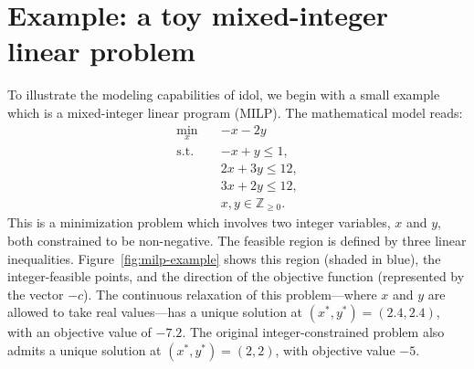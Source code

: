 \section{Example: a toy mixed-integer linear problem}
\label{sec:milp-example}

To illustrate the modeling capabilities of \textsf{idol}, we begin with a
small example which is a mixed-integer linear program (MILP). 
%
The mathematical model reads:
\begin{subequations}
    \label{eq:milp-example}
    \begin{align}
        \min_x \quad & -x - 2y \\
        \text{s.t.} & -x + y \le 1, \\
        & 2x + 3y \le 12, \\
        & 3x + 2y \le 12, \\
        & x,y\in\mathbb{Z}_{\ge 0}.
    \end{align}
\end{subequations}
This is a minimization problem which involves two integer variables, $x$ and
$y$, both constrained to be non-negative. The feasible region is defined by
three linear inequalities. Figure~\ref{fig:milp-example} shows this region
(shaded in blue), the integer-feasible points, and the direction of the
objective function (represented by the vector $-c$).
%
The continuous relaxation of this problem---where $x$ and $y$ are allowed to
take real values---has a unique solution at $(x^*, y^*) = (2.4, 2.4)$, with an
objective value of $-7.2$. The original integer-constrained problem also
admits a unique solution at $(x^*, y^*) = (2, 2)$, with objective value $-5$.

\newcommand{\drawPoint}[2]{\filldraw[orange] (#1,#2) circle (1.5pt) node[anchor=north west] {};}

